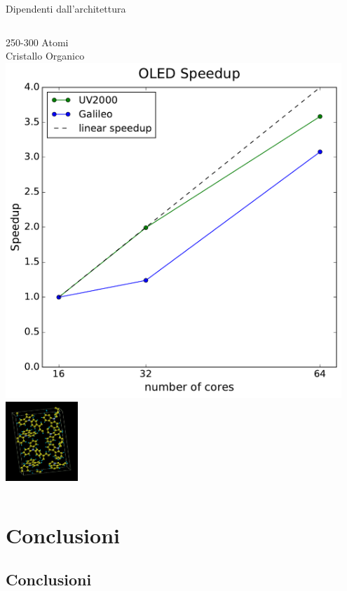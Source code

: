 \documentclass[8pt]{beamer}
\begin{document}
\begin{frame}{Dipendenti dall'architettura}
\begin{columns}
	\begin{center}	
		250-300 Atomi\\
		Cristallo Organico\\
		\includegraphics[width=0.95\textwidth]{concl_oled.pdf}	\\	
		\includegraphics[height=3cm]{beam_cbp.png}
	\end{center}		
	
	\end{columns}
	

\end{frame}






\section{Conclusioni}
\subsection{Conclusioni}
\end{document}
